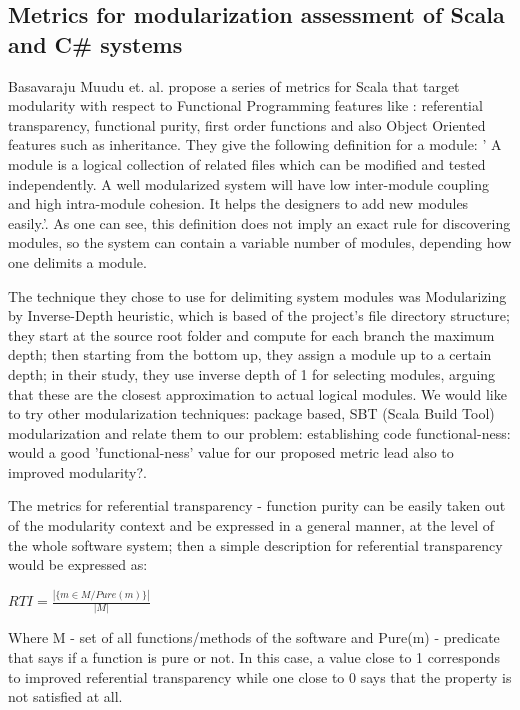 \documentclass{article}
\begin{document}
\subsection{ Metrics for modularization assessment of Scala and C{\#} systems }
Basavaraju Muudu et. al. \cite{DBLP:conf/icse/MudduABP13} propose a series of metrics for Scala that target modularity with respect to Functional Programming features like : referential transparency, functional purity, first order functions and also Object Oriented features such as inheritance. They give the following definition for a module: ' A module is a logical collection of related files which can be modified and tested independently. A well modularized system will have low inter-module coupling and high intra-module cohesion. It helps the designers to add new modules easily.'\cite{DBLP:conf/icse/MudduABP13}. As one can see, this definition does not imply an exact rule for discovering  modules, so the system can contain a variable number of modules, depending how one delimits a module. \par

The technique they chose to use for delimiting system modules  was Modularizing by  Inverse-Depth heuristic, which is based of the project's file directory structure; they start at the source root folder and compute for each branch the maximum depth; then starting from the bottom up, they assign a module up to a certain depth; in their study, they use inverse depth of 1 for selecting modules, arguing that these are the closest approximation to actual logical modules. We would like to try other modularization techniques: package based, SBT (Scala Build Tool)  modularization and relate them to our problem: establishing code functional-ness: would a good 'functional-ness' value for our proposed metric lead also to improved modularity?.\par

The metrics for referential transparency - function purity can be easily taken out of the modularity context and be expressed in a general manner, at the level of the whole software system; then a simple description for referential transparency would be expressed as:  \par
\begin{center}
\begin{math}
  RTI = \frac{ | \{ m \in M / Pure(m) \} | } { | M | }
\end{math}
\end{center}

Where  M - set of all functions/methods of the software and  Pure(m) - predicate that says if a function is pure or not. In this case, a value close to 1 corresponds to improved referential transparency while one close to 0 says that the property is not satisfied at all. \par
\end{document}
